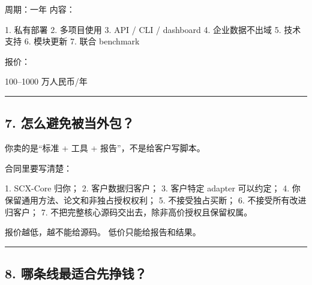 \documentclass[
  12pt,
]{ctexart}
\newenvironment{Shaded}{}{}
\newcommand{\NormalTok}[1]{#1}
\begin{document}
周期：一年 内容：

\begin{Shaded}
\begin{Highlighting}[]
\NormalTok{1. 私有部署}
\NormalTok{2. 多项目使用}
\NormalTok{3. API / CLI / dashboard}
\NormalTok{4. 企业数据不出域}
\NormalTok{5. 技术支持}
\NormalTok{6. 模块更新}
\NormalTok{7. 联合 benchmark}
\end{Highlighting}
\end{Shaded}

报价：

\begin{Shaded}
\begin{Highlighting}[]
\NormalTok{100–1000 万人民币/年}
\end{Highlighting}
\end{Shaded}

\begin{center}\rule{0.5\linewidth}{0.5pt}\end{center}

\subsection{7.
怎么避免被当外包？}\label{ux600eux4e48ux907fux514dux88abux5f53ux5916ux5305}

你卖的是``标准 + 工具 + 报告''，不是给客户写脚本。

合同里要写清楚：

\begin{Shaded}
\begin{Highlighting}[]
\NormalTok{1. SCX{-}Core 归你；}
\NormalTok{2. 客户数据归客户；}
\NormalTok{3. 客户特定 adapter 可以约定；}
\NormalTok{4. 你保留通用方法、论文和非独占授权权利；}
\NormalTok{5. 不接受独占买断；}
\NormalTok{6. 不接受所有改进归客户；}
\NormalTok{7. 不把完整核心源码交出去，除非高价授权且保留权属。}
\end{Highlighting}
\end{Shaded}

报价越低，越不能给源码。 低价只能给报告和结果。

\begin{center}\rule{0.5\linewidth}{0.5pt}\end{center}

\subsection{8.
哪条线最适合先挣钱？}\label{ux54eaux6761ux7ebfux6700ux9002ux5408ux5148ux6323ux94b1}
\end{document}

